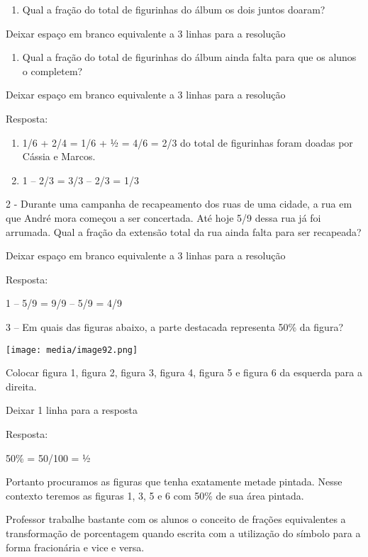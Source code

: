 \begin{enumerate}
\def\labelenumi{\alph{enumi})}
\item
  Qual a fração do total de figurinhas do álbum os dois juntos doaram?
\end{enumerate}

Deixar espaço em branco equivalente a 3 linhas para a resolução

\begin{enumerate}
\def\labelenumi{\alph{enumi})}
\item
  Qual a fração do total de figurinhas do álbum ainda falta para que os
  alunos o completem?
\end{enumerate}

Deixar espaço em branco equivalente a 3 linhas para a resolução

Resposta:

\begin{enumerate}
\def\labelenumi{\alph{enumi})}
\item
  1/6 + 2/4 = 1/6 + ½ = 4/6 = 2/3 do total de figurinhas foram doadas
  por Cássia e Marcos.
\item
  1 -- 2/3 = 3/3 -- 2/3 = 1/3
\end{enumerate}

2 - Durante uma campanha de recapeamento dos ruas de uma cidade, a rua
em que André mora começou a ser concertada. Até hoje 5/9 dessa rua já
foi arrumada. Qual a fração da extensão total da rua ainda falta para
ser recapeada?

Deixar espaço em branco equivalente a 3 linhas para a resolução

Resposta:

1 -- 5/9 = 9/9 -- 5/9 = 4/9

3 -- Em quais das figuras abaixo, a parte destacada representa 50\% da
figura?

\texttt{[image: media/image92.png]}

Colocar figura 1, figura 2, figura 3, figura 4, figura 5 e figura 6 da
esquerda para a direita.

Deixar 1 linha para a resposta

Resposta:

50\% = 50/100 = ½

Portanto procuramos as figuras que tenha exatamente metade pintada.
Nesse contexto teremos as figuras 1, 3, 5 e 6 com 50\% de sua área
pintada.

Professor trabalhe bastante com os alunos o conceito de frações
equivalentes a transformação de porcentagem quando escrita com a
utilização do símbolo para a forma fracionária e vice e versa.

